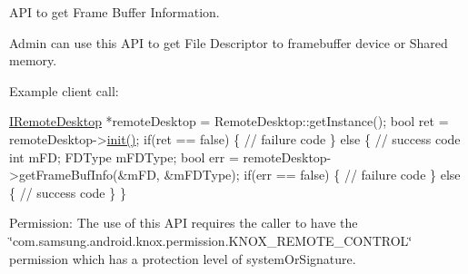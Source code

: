 \-A\-P\-I to get \-Frame \-Buffer \-Information. 

\-Admin can use this \-A\-P\-I to get \-File \-Descriptor to framebuffer device or \-Shared memory. 

\-Example client call\-:


\begin{DoxyPre}
  \hyperlink{classknoxremotedesktop_1_1IRemoteDesktop}{IRemoteDesktop} *remoteDesktop = RemoteDesktop::getInstance();
  bool ret = remoteDesktop->\hyperlink{classknoxremotedesktop_1_1IRemoteDesktop_a7bed40d98c61713a69cf1dad8b37beae}{init()};
  if(ret == false)  \{
     // failure code
  \} else \{
     // success code	 
     int	     mFD;
     FDType 	 mFDType;
     bool err = remoteDesktop->getFrameBufInfo(&mFD, &mFDType);
     if(err == false)  \{
         // failure code
     \} else \{
         // success code	 
     \}
  \}
 \end{DoxyPre}


\begin{DoxyParagraph}{\-Permission\-: }
\-The use of this \-A\-P\-I requires the caller to have the \char`\"{}com.\-samsung.\-android.\-knox.\-permission.\-K\-N\-O\-X\-\_\-\-R\-E\-M\-O\-T\-E\-\_\-\-C\-O\-N\-T\-R\-O\-L\char`\"{} permission which has a protection level of system\-Or\-Signature.
\end{DoxyParagraph}

